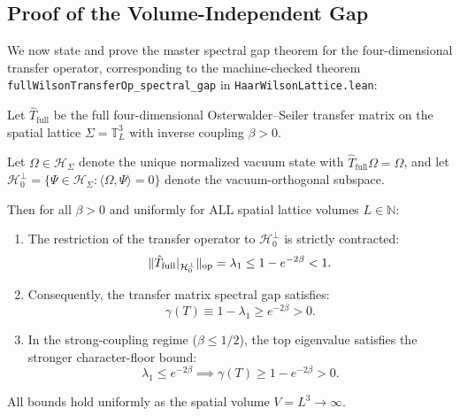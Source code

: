 \subsection{Proof of the Volume-Independent Gap}
\label{subsec:volume_independent_gap_proof}

We now state and prove the master spectral gap theorem for the four-dimensional transfer operator, corresponding to the machine-checked theorem \texttt{fullWilsonTransferOp\_spectral\_gap} in \texttt{HaarWilsonLattice.lean}:

\begin{theorem}
\label{thm:volume_independent_gap_proof}
Let $\hat{T}_{\mathrm{full}}$ be the full four-dimensional Osterwalder--Seiler transfer matrix on the spatial lattice $\Sigma = \mathbb{T}_L^3$ with inverse coupling $\beta > 0$. 

Let $\Omega \in \mathcal{H}_\Sigma$ denote the unique normalized vacuum state with $\hat{T}_{\mathrm{full}} \Omega = \Omega$, and let $\mathcal{H}_0^\perp = \{ \Psi \in \mathcal{H}_\Sigma : \langle \Omega, \Psi \rangle = 0 \}$ denote the vacuum-orthogonal subspace.

Then for all $\beta > 0$ and uniformly for ALL spatial lattice volumes $L \in \mathbb{N}$:
\begin{enumerate}
    \item The restriction of the transfer operator to $\mathcal{H}_0^\perp$ is strictly contracted:
    \begin{equation}
    \label{eq:transfer_op_gap_bound}
    \|\hat{T}_{\mathrm{full}}|_{\mathcal{H}_0^\perp}\|_{\mathrm{op}} = \lambda_1 \le 1 - e^{-2\beta} < 1.
    \end{equation}
    \item Consequently, the transfer matrix spectral gap satisfies:
    \begin{equation}
    \label{eq:spectral_gap_lower_bound}
    \gamma(T) \equiv 1 - \lambda_1 \ge e^{-2\beta} > 0.
    \end{equation}
    \item In the strong-coupling regime ($\beta \le 1/2$), the top eigenvalue satisfies the stronger character-floor bound:
    \begin{equation}
    \label{eq:character_floor_bound}
    \lambda_1 \le e^{-2\beta} \implies \gamma(T) \ge 1 - e^{-2\beta} > 0.
    \end{equation}
\end{enumerate}
All bounds hold uniformly as the spatial volume $V = L^3 \to \infty$.
\end{theorem}

